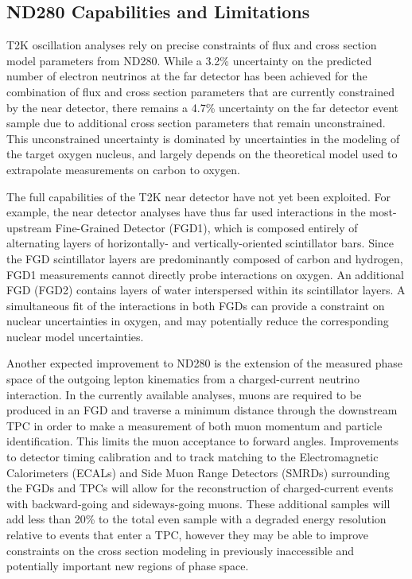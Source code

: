 \subsection{ND280 Capabilities and Limitations}

T2K oscillation analyses rely on precise constraints of flux and cross section model parameters from ND280. While a 3.2\% uncertainty on the predicted number of electron neutrinos at the far detector has been achieved for the combination of flux and cross section parameters that are currently constrained by the near detector, there remains a 4.7\% uncertainty on the far detector event sample due to additional cross section parameters that remain unconstrained. This unconstrained uncertainty is dominated by uncertainties in the modeling of the target oxygen nucleus, and largely depends on the theoretical model used to extrapolate measurements on carbon to oxygen.

The full capabilities of the T2K near detector have not yet been exploited. For example, the near detector analyses have thus far used interactions in the most-upstream Fine-Grained Detector (FGD1), which is composed entirely of alternating layers of horizontally- and vertically-oriented scintillator bars. Since the FGD scintillator layers are predominantly composed of carbon and hydrogen, FGD1 measurements cannot directly probe interactions on oxygen. An additional FGD (FGD2) contains layers of water interspersed within its scintillator layers. A simultaneous fit of the interactions in both FGDs can provide a constraint on nuclear uncertainties in oxygen, and may potentially reduce the corresponding nuclear model uncertainties.

Another expected improvement to ND280 is the extension of the measured phase space of the outgoing lepton kinematics from a charged-current neutrino interaction. In the currently available analyses, muons are required to be produced in an FGD and traverse a minimum distance through the downstream TPC in order to make a measurement of both muon momentum and particle identification. This limits the muon acceptance to forward angles. Improvements to detector timing calibration and to track matching to the Electromagnetic Calorimeters (ECALs) and Side Muon Range Detectors (SMRDs) surrounding the FGDs and TPCs will allow for the reconstruction of charged-current events with backward-going and sideways-going muons. These additional samples will add less than 20\% to the total even sample with a degraded energy resolution relative to events that enter a TPC, however they may be able to improve constraints on the cross section modeling in previously inaccessible and potentially important new regions of phase space.

